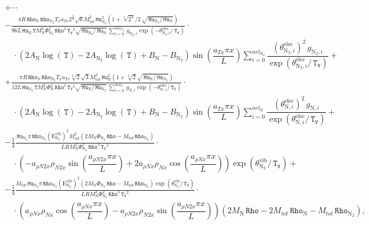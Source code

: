 \documentclass[10pt]{article}
\newcommand{\diff}[2] {\dfrac{\partial #1 }{\partial #2}}
\newcommand{\Rho}{\,\mathtt{Rho}}
\newcommand{\T}{\,\mathtt{T}}
\newcommand{\TV}{\,\mathtt{T_V}}
\newcommand{\N}{\text{N}}
\newcommand{\elec}{\text{elec}}
\newcommand{\vib}{\text{vib}}
\newcommand{\E}{\text{E}}
\newcommand{\Mu}{\, \mathtt{Mu}}
\newcommand{\mix}{\text{mix}\,}
\newcommand{\DKappatrDx}{\diff{\kappa^{tr}_{\mix}}{x}\,}
\newcommand{\eelecNden}{\,\sum_{i=0}^{nel_{\N}}   \, g_{\N,i}   \exp \left( -\theta^{\elec}_{\N,i} / \TV  \right) }
\newcommand{\eelecNdoisden}{\,\sum_{i=0}^{nel_{\N_2}}  \, g_{\N_2,i}   \exp \left( -\theta^{\elec}_{\N_2,i} /  \TV \right)}
\begin{document}
\begin{equation*}
\begin{split} %
&+\cdots\\
&- \frac{\pi R \Rho_{\N} \Rho_{\N_2} T_{x} a_{Tx} 2^{\frac{3}{4}} \sqrt{6} M_{tot}^{2} \Mu_{\N_2}^{2} \left(1 + \sqrt[4]{2^3} / 2
\, \sqrt{ \Mu_{\N_2} / \Mu_{\N} }\right) }{96 L \Mu_{\N} \T M_{\N}^{3} \Phi_{\N_2}^{2} \Rho^{2} \TV^{2} \sqrt{\Mu_{\N_2} /
\Mu_{\N} } \eelecNdoisden}\cdot\\
 &\quad \cdot( 2 A_{\N} \log(\T) - 2 A_{\N_2} \log(\T) +B_{\N} - B_{\N_2} ) \sin\left(\dfrac{a_{Tx} \pi x}{L}\right) 
\sum_{i=0}^{nel_{\N_2}} \dfrac{ \left( \theta^{\elec}_{\N_2,i} \right)^2   \, g_{\N_2,i} }{ \exp \left( \theta^{\elec}_{\N_2,i} / 
\TV \right)} +\\ 
%
&+ \frac{\pi R \Rho_{\N} \Rho_{\N_2} T_{x} a_{Tx} \sqrt[4]{2} \sqrt{3} M_{tot}^{2} \Mu_{\N}^{2} \left(1 + \sqrt[4]{2} \sqrt{
\Mu_{\N} / \Mu_{\N_2} }\right) }{12 L \Mu_{\N_2} \T M_{\N}^{3} \Phi_{\N}^{2} \Rho^{2} \TV^{2} \sqrt{\Mu_{\N} / \Mu_{\N_2} }
\eelecNden }\cdot\\
 &\quad \cdot( 2 A_{\N} \log(\T) - 2 A_{\N_2} \log(\T) +B_{\N} - B_{\N_2} ) \sin\left(\dfrac{a_{Tx} \pi x}{L}\right)
\sum_{i=0}^{nel_{\N}} \dfrac{ \left( \theta^{\elec}_{\N,i} \right)^2   \, g_{\N,i} }{ \exp \left( \theta^{\elec}_{\N,i} / \TV
\right)}+\\ 
%
&- \frac{1}{4}\frac{\Mu_{\N_2} \pi \Rho_{\N_2} \left( \E^{\vib}_{\N_2} \right)^2 M_{tot}^{2} \left(2 M_{\N} \Phi_{\N_2} \Rho -
M_{tot} \Rho_{\N_2} \right)}{L R M_{\N}^{2} \Phi_{\N_2}^{2} \Rho^{3} \TV^{2}} \cdot\\
 &\quad \cdot\left(- a_{\rho N2 x} \rho_{N2 x} \sin\left(\dfrac{a_{\rho N2 x} \pi x}{L}\right) + 2 a_{\rho N x} \rho_{N x}
\cos\left(\dfrac{a_{\rho N x} \pi x}{L}\right)\right) \exp\left( \theta^{\vib}_{\N_2} / \TV \right) +\\ 
%
&- \frac{1}{4}\frac{M_{tot} \Mu_{\N_2} \pi \Rho_{\N_2} \left( \E^{\vib}_{\N_2} \right)^2 \left(2 M_{\N} \Phi_{\N_2} \Rho - M_{tot}
\Rho_{\N_2} \right)\exp\left( \theta^{\vib}_{\N_2} / \TV \right)}{L R M_{\N}^{2} \Phi_{\N_2}^{2} \Rho^{4} \TV^{2}} \cdot\\
 &\quad \cdot\left(a_{\rho N x} \rho_{N x} \cos\left(\dfrac{a_{\rho N x} \pi x}{L}\right) - a_{\rho N2 x} \rho_{N2 x}
\sin\left(\dfrac{a_{\rho N2 x} \pi x}{L}\right)\right) \left(2 M_{\N} \Rho - 2 M_{tot} \Rho_{\N} - M_{tot} \Rho_{\N_2}\right) ,
%
%
\end{split}
\end{equation*}
\end{document}
